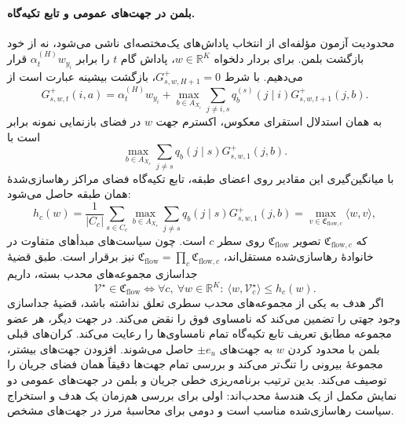 \paragraph{بلمن در جهت‌های عمومی و تابع تکیه‌گاه.}
محدودیت آزمون مؤلفه‌ای از انتخاب پاداش‌های یک‌مختصه‌ای ناشی می‌شود، نه از خود بازگشت بلمن. برای بردار دلخواه $w\in\mathbb R^K$، پاداش گام $t$ را برابر $\alpha_t^{(H)}w_{y_i}$ قرار می‌دهیم. با شرط $G^+_{s,w,H+1}=0$، بازگشت بیشینه عبارت است از
\begin{equation}\label{cmp:eq:ch3-geometry-directional-bellman}
G^+_{s,w,t}(i,a)=\alpha_t^{(H)}w_{y_i}+\max_{b\in A_{X_i}}\sum_{j\ne i,s}q_b^{(s)}(j\mid i)G^+_{s,w,t+1}(j,b).
\end{equation}
به همان استدلال استقرای معکوس، اکسترم جهت $w$ در فضای بازنمایی نمونه برابر است با
\begin{equation}\label{cmp:eq:ch3-geometry-directional-origin}
\max_{b\in A_{X_s}}\sum_{j\ne s}q_b(j\mid s)G^+_{s,w,1}(j,b).
\end{equation}
با میانگین‌گیری این مقادیر روی اعضای طبقه، تابع تکیه‌گاه فضای مراکز رهاسازی‌شدهٔ همان طبقه حاصل می‌شود:
\begin{equation}\label{cmp:eq:ch3-geometry-support-function}
h_c(w)=\frac1{|C_c|}\sum_{s\in C_c}\max_{b\in A_{X_s}}\sum_{j\ne s}q_b(j\mid s)G^+_{s,w,1}(j,b)
=\max_{v\in\mathfrak C_{\mathrm{flow},c}}\langle w,v\rangle,
\end{equation}
که $\mathfrak C_{\mathrm{flow},c}$ تصویر $\mathfrak C_{\mathrm{flow}}$ روی سطر $c$ است. چون سیاست‌های مبدأهای متفاوت در خانوادهٔ رهاسازی‌شده مستقل‌اند، $\mathfrak C_{\mathrm{flow}}=\prod_c\mathfrak C_{\mathrm{flow},c}$ نیز برقرار است. طبق قضیهٔ جداسازی مجموعه‌های محدب بسته، داریم
\begin{equation}\label{cmp:eq:ch3-geometry-support-characterization}
\boxed{\mathcal V^\star\in\mathfrak C_{\mathrm{flow}}\iff\forall c,\ \forall w\in\mathbb R^K:\ \langle w,\mathcal V_c^\star\rangle\le h_c(w).}
\end{equation}
اگر هدف به یکی از مجموعه‌های محدب سطری تعلق نداشته باشد، قضیهٔ جداسازی وجود جهتی را تضمین می‌کند که نامساوی فوق را نقض می‌کند. در جهت دیگر، هر عضو مجموعه مطابق تعریف تابع تکیه‌گاه تمام نامساوی‌ها را رعایت می‌کند. کران‌های قبلی بلمن با محدود کردن $w$ به جهت‌های $\pm e_u$ حاصل می‌شوند. افزودن جهت‌های بیشتر، مجموعهٔ بیرونی را تنگ‌تر می‌کند و بررسی تمام جهت‌ها دقیقاً همان فضای جریان را توصیف می‌کند. بدین ترتیب برنامه‌ریزی خطی جریان و بلمن در جهت‌های عمومی دو نمایش مکمل از یک هندسهٔ محدب‌اند: اولی برای بررسی هم‌زمان یک هدف و استخراج سیاست رهاسازی‌شده مناسب است و دومی برای محاسبهٔ مرز در جهت‌های مشخص.

